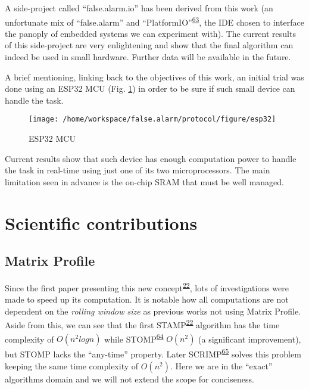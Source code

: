\documentclass[12pt,twoside]{fmupthesis}
\begin{document}
A side-project called ``false.alarm.io'' has been derived from this work (an unfortunate mix of
``false.alarm'' and ``PlatformIO''\textsuperscript{\protect\hyperlink{ref-PlatformIO}{63}}, the IDE chosen to interface the panoply of embedded
systems we can experiment with). The current results of this side-project are very enlightening and
show that the final algorithm can indeed be used in small hardware. Further data will be available
in the future.

A brief mentioning, linking back to the objectives of this work, an initial trial was done using an
ESP32 MCU (Fig. \ref{fig:esp32}) in order to be sure if such small device can handle the task.
\begin{figure}

{\centering \texttt{[image: /home/workspace/false.alarm/protocol/figure/esp32]} 

}

\caption{ESP32 MCU}\label{fig:esp32}
\end{figure}
Current results show that such device has enough computation power to handle the task in real-time
using just one of its two microprocessors. The main limitation seen in advance is the on-chip SRAM
that must be well managed.

\hypertarget{scientific-contributions}{%
\chapter{Scientific contributions}\label{scientific-contributions}}

\hypertarget{matrix-profile}{%
\section{Matrix Profile}\label{matrix-profile}}

Since the first paper presenting this new concept\textsuperscript{\protect\hyperlink{ref-Yeh2017a}{22}}, lots of investigations were made to
speed up its computation. It is notable how all computations are not dependent on the \emph{rolling
window size} as previous works not using Matrix Profile. Aside from this, we can see that the first
STAMP\textsuperscript{\protect\hyperlink{ref-Yeh2017a}{22}} algorithm has the time complexity of \(O(n^2log{n})\) while STOMP\textsuperscript{\protect\hyperlink{ref-zhu2016}{64}}
\(O(n^2)\) (a significant improvement), but STOMP lacks the ``any-time'' property. Later SCRIMP\textsuperscript{\protect\hyperlink{ref-zhu2018}{65}} solves this problem keeping the same time complexity of \(O(n^2)\). Here we are in the
``exact'' algorithms domain and we will not extend the scope for conciseness.
\end{document}
